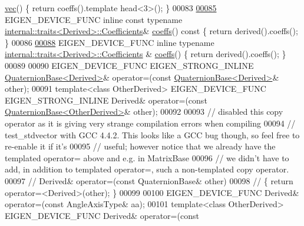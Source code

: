 \begin{DoxyCode}
      \hyperlink{group___geometry___module_abc489fa38de6a3c22402101fa0e89342}{vec}() \{ \textcolor{keywordflow}{return} coeffs().template head<3>(); \}
00083 
\hyperlink{group___geometry___module_aa7bb3fc337ffa82b0ad795783eb8a2ce}{00085}   EIGEN\_DEVICE\_FUNC \textcolor{keyword}{inline} \textcolor{keyword}{const} \textcolor{keyword}{typename} 
      \hyperlink{struct_eigen_1_1internal_1_1traits}{internal::traits<Derived>::Coefficients}& 
      \hyperlink{group___geometry___module_aa7bb3fc337ffa82b0ad795783eb8a2ce}{coeffs}()\textcolor{keyword}{ const }\{ \textcolor{keywordflow}{return} derived().coeffs(); \}
00086 
\hyperlink{group___geometry___module_afae737227fb9fb3f3c674cd1fccb4de0}{00088}   EIGEN\_DEVICE\_FUNC \textcolor{keyword}{inline} \textcolor{keyword}{typename} \hyperlink{struct_eigen_1_1internal_1_1traits}{internal::traits<Derived>::Coefficients}
      & \hyperlink{group___geometry___module_afae737227fb9fb3f3c674cd1fccb4de0}{coeffs}() \{ \textcolor{keywordflow}{return} derived().coeffs(); \}
00089 
00090   EIGEN\_DEVICE\_FUNC EIGEN\_STRONG\_INLINE \hyperlink{group___geometry___module_class_eigen_1_1_quaternion_base}{QuaternionBase<Derived>}& operator=(\textcolor{keyword}{const} 
      \hyperlink{group___geometry___module_class_eigen_1_1_quaternion_base}{QuaternionBase<Derived>}& other);
00091   \textcolor{keyword}{template}<\textcolor{keyword}{class} OtherDerived> EIGEN\_DEVICE\_FUNC EIGEN\_STRONG\_INLINE Derived& operator=(\textcolor{keyword}{const} 
      \hyperlink{group___geometry___module_class_eigen_1_1_quaternion_base}{QuaternionBase<OtherDerived>}& other);
00092 
00093 \textcolor{comment}{// disabled this copy operator as it is giving very strange compilation errors when compiling}
00094 \textcolor{comment}{// test\_stdvector with GCC 4.4.2. This looks like a GCC bug though, so feel free to re-enable it if it's}
00095 \textcolor{comment}{// useful; however notice that we already have the templated operator= above and e.g. in MatrixBase}
00096 \textcolor{comment}{// we didn't have to add, in addition to templated operator=, such a non-templated copy operator.}
00097 \textcolor{comment}{//  Derived& operator=(const QuaternionBase& other)}
00098 \textcolor{comment}{//  \{ return operator=<Derived>(other); \}}
00099 
00100   EIGEN\_DEVICE\_FUNC Derived& operator=(\textcolor{keyword}{const} AngleAxisType& aa);
00101   \textcolor{keyword}{template}<\textcolor{keyword}{class} OtherDerived> EIGEN\_DEVICE\_FUNC Derived& operator=(\textcolor{keyword}{const} 

\end{DoxyCode}
